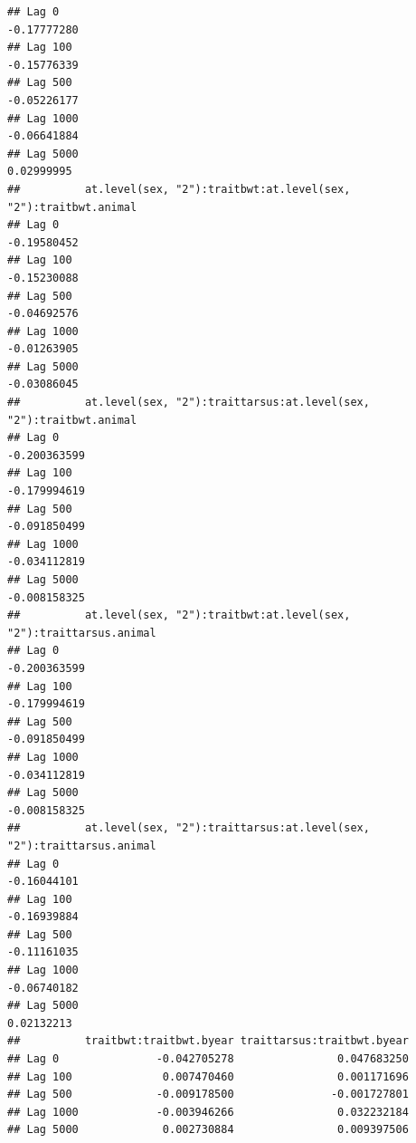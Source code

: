 \documentclass[
  12pt,
]{book}
\begin{document}
\begin{verbatim}
## Lag 0                                                             -0.17777280
## Lag 100                                                           -0.15776339
## Lag 500                                                           -0.05226177
## Lag 1000                                                          -0.06641884
## Lag 5000                                                           0.02999995
##          at.level(sex, "2"):traitbwt:at.level(sex, "2"):traitbwt.animal
## Lag 0                                                       -0.19580452
## Lag 100                                                     -0.15230088
## Lag 500                                                     -0.04692576
## Lag 1000                                                    -0.01263905
## Lag 5000                                                    -0.03086045
##          at.level(sex, "2"):traittarsus:at.level(sex, "2"):traitbwt.animal
## Lag 0                                                         -0.200363599
## Lag 100                                                       -0.179994619
## Lag 500                                                       -0.091850499
## Lag 1000                                                      -0.034112819
## Lag 5000                                                      -0.008158325
##          at.level(sex, "2"):traitbwt:at.level(sex, "2"):traittarsus.animal
## Lag 0                                                         -0.200363599
## Lag 100                                                       -0.179994619
## Lag 500                                                       -0.091850499
## Lag 1000                                                      -0.034112819
## Lag 5000                                                      -0.008158325
##          at.level(sex, "2"):traittarsus:at.level(sex, "2"):traittarsus.animal
## Lag 0                                                             -0.16044101
## Lag 100                                                           -0.16939884
## Lag 500                                                           -0.11161035
## Lag 1000                                                          -0.06740182
## Lag 5000                                                           0.02132213
##          traitbwt:traitbwt.byear traittarsus:traitbwt.byear
## Lag 0               -0.042705278                0.047683250
## Lag 100              0.007470460                0.001171696
## Lag 500             -0.009178500               -0.001727801
## Lag 1000            -0.003946266                0.032232184
## Lag 5000             0.002730884                0.009397506

\end{verbatim}
\end{document}
